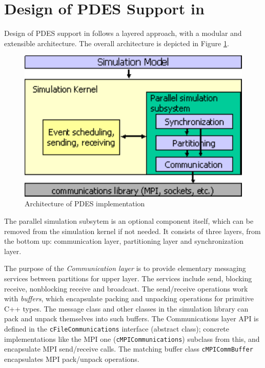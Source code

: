 \section{Design of PDES Support in {\opp}}

Design of PDES support in {\opp} follows a layered approach,
with a modular and extensible architecture. The overall
architecture is depicted in Figure \ref{fig:parsim-arch}.

\begin{figure}[htbp]
  \begin{center}
    \includegraphics{figures/parsim-arch}
    \caption{Architecture of {\opp} PDES implementation}
    \label{fig:parsim-arch}
  \end{center}
\end{figure}

The parallel simulation subsytem is an optional component
itself, which can be removed from the simulation kernel
if not needed. It consists of three layers, from the bottom up:
communication layer, partitioning layer and synchronization layer.

The purpose of the \textit{Communication layer} is to
provide elementary messaging services between partitions for
upper layer. The services include send, blocking receive,
nonblocking receive and broadcast. The send/receive operations
work with \textit{buffers}, which encapsulate packing and unpacking
operations for primitive C++ types. The message class and
other classes in the simulation library can pack and unpack
themselves into such buffers. The Communications layer API
is defined in the \texttt{cFileCommunications} interface
(abstract class); concrete implementations like the MPI
one (\texttt{cMPICommunications}) subclass from this,
and encapsulate MPI send/receive calls. The matching buffer
class \texttt{cMPICommBuffer} encapsulates MPI pack/unpack
operations.

